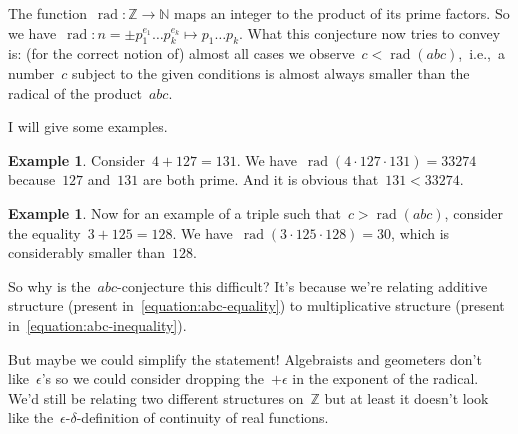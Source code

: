 \documentclass[11pt, a4paper, openany, oneside, article]{memoir}
\theoremstyle{definition}
\newtheorem{example}[theorem]{Example}
\DeclareMathOperator\rad{rad}
\begin{document}
The function~$\rad\colon\mathbb{Z}\to\mathbb{N}$ maps an integer to the product of its prime factors. So we have~$\rad\colon n=\pm p_1^{e_1}\ldots p_k^{e_k}\mapsto p_1\ldots p_k$. What this conjecture now tries to convey is: (for the correct notion of) almost all cases we observe~$c<\rad(abc)$,~i.e.,~a number~$c$ subject to the given conditions is almost always smaller than the radical of the product~$abc$.

I will give some examples.

\begin{example}
  \label{example:abc-1}
  Consider~$4+127=131$. We have~$\rad(4\cdot 127\cdot 131)=33274$ because~$127$ and~$131$ are both prime. And it is obvious that~$131<33274$.
\end{example}

\begin{example}
  \label{example:abc-2}
  Now for an example of a triple such that~$c>\rad(abc)$, consider the equality~$3+125=128$. We have~$\rad(3\cdot 125\cdot 128)=30$, which is considerably smaller than~$128$.
\end{example}

So why is the~$abc$\nobreakdash-conjecture this difficult? It's because we're relating additive structure (present in~\eqref{equation:abc-equality}) to multiplicative structure (present in~\eqref{equation:abc-inequality}).

But maybe we could simplify the statement! Algebraists and geometers don't like~$\epsilon$'s so we could consider dropping the~$+\epsilon$ in the exponent of the radical. We'd still be relating two different structures on~$\mathbb{Z}$ but at least it doesn't look like the~$\epsilon$-$\delta$-definition of continuity of real functions.
\end{document}
